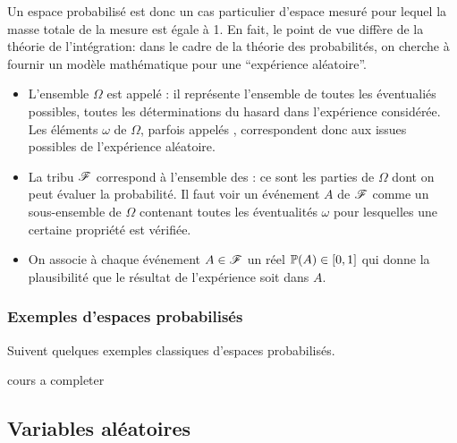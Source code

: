 \begin{interp}
    Un espace probabilisé est donc un cas particulier d'espace mesuré
    pour lequel la masse totale de la mesure est égale à 1. En fait,
    le point de vue diffère de la théorie de l'intégration: dans
    le cadre de la théorie des probabilités, on cherche à fournir
    un modèle mathématique pour une ``expérience aléatoire''.

    \begin{itemize}
        \item L'ensemble \(\Omega\) est appelé :
        il représente l'ensemble de toutes les éventualiés possibles,
        toutes les déterminations du hasard dans l'expérience considérée.
        Les éléments \(\omega\) de \(\Omega\), parfois appelés
        , correspondent donc aux issues
        possibles de l'expérience aléatoire.

        \item La tribu \(\mathscr{F}\) correspond à l'ensemble des
        :  ce sont les parties de \(\Omega\) dont
        on peut évaluer la probabilité. Il faut voir un événement
        \(A\) de \(\mathscr{F}\) comme un sous-ensemble de \(\Omega\) 
        contenant toutes les éventualités \(\omega\) pour
        lesquelles une certaine propriété est vérifiée.

        \item On associe à chaque événement \(A\in\mathscr{F}\) un réel
        \(\mathbb{P}(A) \in \mathopen{}\left[0,1\right]\mathclose{}\) qui donne la plausibilité que
        le résultat de l'expérience soit dans \(A\).
    \end{itemize}
\end{interp}

\subsubsection{Exemples d'espaces probabilisés}\label{subsubsec:2}
\setcounter{subsection}{0}
Suivent quelques exemples classiques d'espaces probabilisés.

\begin{exs}
    cours a completer
\end{exs}


\subsection{Variables aléatoires}\label{subsec:2}

